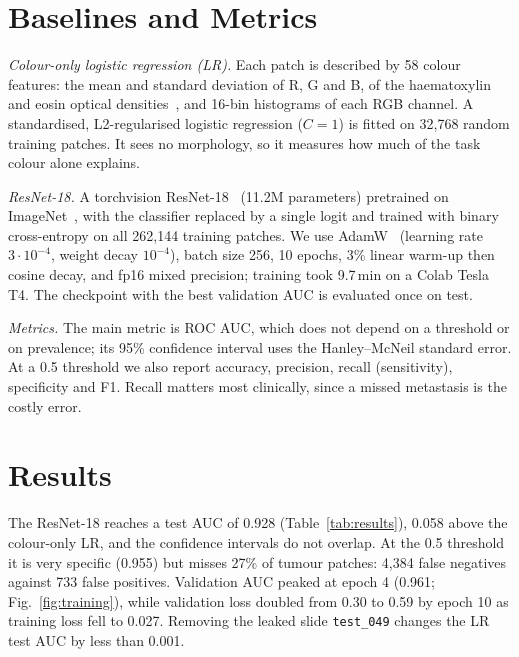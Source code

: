 \documentclass[conference]{IEEEtran}
\begin{document}
\section{Baselines and Metrics}
\textit{Colour-only logistic regression (LR).} Each patch is described by 58 colour features: the mean and standard deviation of R, G and B, of the haematoxylin and eosin optical densities~\cite{ruifrok2001}, and 16-bin histograms of each RGB channel. A standardised, L2-regularised logistic regression ($C=1$) is fitted on 32,768 random training patches. It sees no morphology, so it measures how much of the task colour alone explains.

\textit{ResNet-18.} A torchvision ResNet-18~\cite{he2016} (11.2M parameters) pretrained on ImageNet~\cite{deng2009}, with the classifier replaced by a single logit and trained with binary cross-entropy on all 262,144 training patches. We use AdamW~\cite{loshchilov2019} (learning rate $3\cdot10^{-4}$, weight decay $10^{-4}$), batch size 256, 10 epochs, 3\% linear warm-up then cosine decay, and fp16 mixed precision; training took 9.7\,min on a Colab Tesla T4. The checkpoint with the best validation AUC is evaluated once on test.

\textit{Metrics.} The main metric is ROC AUC, which does not depend on a threshold or on prevalence; its 95\% confidence interval uses the Hanley--McNeil standard error. At a 0.5 threshold we also report accuracy, precision, recall (sensitivity), specificity and F1. Recall matters most clinically, since a missed metastasis is the costly error.

\section{Results}
The ResNet-18 reaches a test AUC of 0.928 (Table~\ref{tab:results}), 0.058 above the colour-only LR, and the confidence intervals do not overlap. At the 0.5 threshold it is very specific (0.955) but misses 27\% of tumour patches: 4,384 false negatives against 733 false positives. Validation AUC peaked at epoch 4 (0.961; Fig.~\ref{fig:training}), while validation loss doubled from 0.30 to 0.59 by epoch 10 as training loss fell to 0.027. Removing the leaked slide \texttt{test\_049} changes the LR test AUC by less than 0.001.
\end{document}
